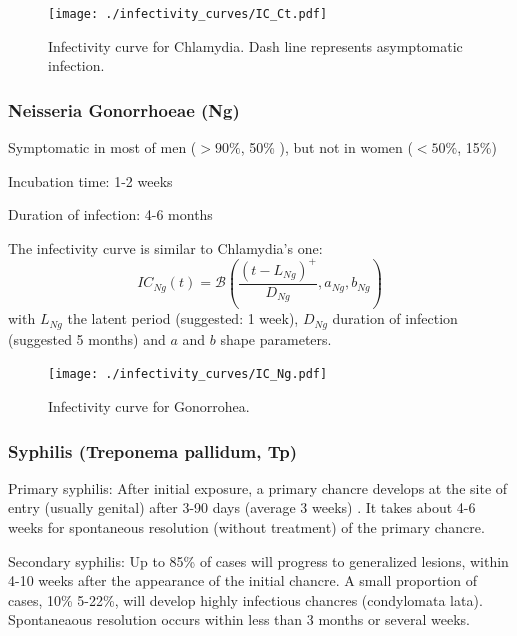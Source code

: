 \documentclass[11pt, onecolumn]{article}
\begin{document}
\begin{figure}[!ht]
\centering
    \texttt{[image: ./infectivity\_curves/IC\_Ct.pdf]}
\caption{Infectivity curve for Chlamydia. Dash line represents asymptomatic infection.}
\label{fig:ICCt}
\end{figure}



\subsubsection{Neisseria Gonorrhoeae (Ng)}

 Symptomatic in most of men ($> 90\%$\cite{Ison:2011eg,Kretzschmar:1996ur}, 50\%\cite{Korenromp:2002gt} ), but not in women ($< 50\%$\cite{Ison:2011eg,Kretzschmar:1996ur}, 15\%\cite{Korenromp:2002gt}) 
 
 Incubation time: 1-2 weeks\cite{Kretzschmar:1996ur}
 
 Duration of infection: 4-6 months \cite{Chen:2010hx,Korenromp:2002gt}
 
 The infectivity curve is similar to Chlamydia's one:
$$IC_{Ng}(t) = \mathcal{B}\left(\frac{(t-L_{Ng})^+}{D_{Ng}},a_{Ng},b_{Ng}\right)$$
with $L_{Ng}$ the latent period (suggested: 1 week), $D_{Ng}$ duration of infection (suggested 5 months) and $a$ and $b$ shape parameters.
\begin{figure}[!ht]
\centering
    \texttt{[image: ./infectivity\_curves/IC\_Ng.pdf]}
\caption{Infectivity curve for Gonorrohea.}
\label{fig:ICNg}
\end{figure} 
 
 
 \subsubsection{Syphilis (Treponema pallidum, Tp)}

Primary syphilis: After initial exposure, a primary chancre develops at the site of entry (usually genital) after 3-90 days (average 3 weeks) \cite{Kent:2008ch,Horvath:2011fw}. It takes about 4-6 weeks for spontaneous resolution (without treatment) of the primary chancre.

Secondary syphilis: Up to 85\% of cases will progress to generalized lesions\cite{Horvath:2011fw}, within 4-10 weeks after the appearance of the initial chancre\cite{Kent:2008ch,Horvath:2011fw}. A small proportion of cases, 10\%\cite{Horvath:2011fw} 5-22\%\cite{Kent:2008ch}, will develop highly infectious chancres (condylomata lata). Spontaneaous resolution occurs within less than 3 months\cite{Horvath:2011fw} or several weeks\cite{Kent:2008ch}.
\end{document}
